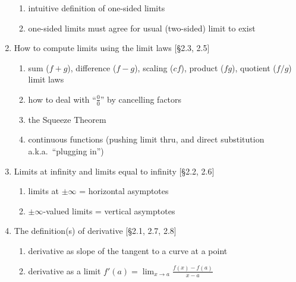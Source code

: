 \documentclass[11pt]{article}
\begin{document}
\begin{enumerate}
\begin{enumerate}
\item intuitive definition of one-sided limits
\item one-sided limits must agree for usual (two-sided) limit to exist
\end{enumerate}
\item How to compute limits using the limit laws [\S2.3, 2.5]
\begin{enumerate}
\item sum ($f+g$), difference ($f-g$), scaling ($cf$), product ($fg$), quotient ($f/g$) limit laws
\item how to deal with ``$\frac{0}{0}$'' by cancelling factors
\item the Squeeze Theorem
\item continuous functions (pushing limit thru, and direct substitution a.k.a.~``plugging in'')
\end{enumerate}
\item Limits at infinity and limits equal to infinity [\S2.2, 2.6]
\begin{enumerate}
\item limits at $\pm \infty$ = horizontal asymptotes
\item $\pm \infty$-valued limits = vertical asymptotes
\end{enumerate}
\item The definition(s) of derivative [\S2.1, 2.7, 2.8]
\begin{enumerate}
\item derivative as slope of the tangent to a curve at a point
\item derivative as a limit $f'(a) = \displaystyle \lim_{x \to a} \frac{f(x)-f(a)}{x-a}$
\end{enumerate}
\end{enumerate}
\end{document}
